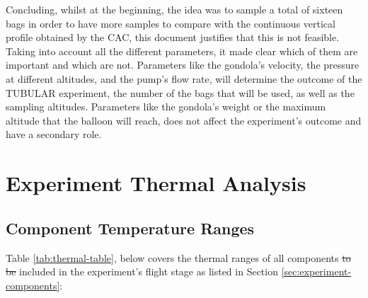 \documentclass[a4paper,12pt,oneside]{article}
\providecommand{\DIFdeltex}[1]{{\protect\color{red}\sout{#1}}}                      %
\providecommand{\DIFdelbegin}{} %
\providecommand{\DIFdelend}{} %
\providecommand{\DIFdel}[1]{\texorpdfstring{\DIFdeltex{#1}}{}} %
\newcommand{\DIFscaledelfig}{0.5}
\newlength{\DIFdelgraphicswidth} %
\newlength{\DIFdelgraphicsheight} %
\newcommand{\DIFdelincludegraphics}[2][]{%
\sbox{\DIFdelgraphicsbox}{\DIFOincludegraphics[#1]{#2}}%
\settoboxwidth{\DIFdelgraphicswidth}{\DIFdelgraphicsbox} %
\settoboxtotalheight{\DIFdelgraphicsheight}{\DIFdelgraphicsbox} %
\scalebox{\DIFscaledelfig}{%
\parbox[b]{\DIFdelgraphicswidth}{\usebox{\DIFdelgraphicsbox}\\[-\baselineskip] \rule{\DIFdelgraphicswidth}{0em}}\llap{\resizebox{\DIFdelgraphicswidth}{\DIFdelgraphicsheight}{%
\setlength{\unitlength}{\DIFdelgraphicswidth}%
\begin{picture}(1,1)%
\thicklines\linethickness{2pt} %
{\color[rgb]{1,0,0}\put(0,0){\framebox(1,1){}}}%
{\color[rgb]{1,0,0}\put(0,0){\line( 1,1){1}}}%
{\color[rgb]{1,0,0}\put(0,1){\line(1,-1){1}}}%
\end{picture}%
}\hspace*{3pt}}} %
} %
\DeclareRobustCommand{\DIFdelbegin}{\DIFOdelbegin \let\includegraphics\DIFdelincludegraphics} %
\DeclareRobustCommand{\DIFdelend}{\DIFOaddend \let\includegraphics\DIFOincludegraphics} %
\begin{document}
\begin{appendices}
Concluding, whilst at the beginning, the idea was to sample a total of sixteen bags in order to have more samples to compare with the continuous vertical profile obtained by the CAC, this document justifies that this is not feasible. Taking into account all the different parameters, it made clear which of them are important and which are not. Parameters like the gondola's velocity, the pressure at different altitudes, and the pump's flow rate, will determine the outcome of the TUBULAR experiment, the number of the bags that will be used, as well as the sampling altitudes. Parameters like the gondola's weight or the maximum altitude that the balloon will reach, does not affect the experiment's outcome and have a secondary role.









\newpage
\newpage
\section{Experiment Thermal Analysis} \label{sec:appI}
\subsection{Component Temperature Ranges}

Table {\ref{tab:thermal-table}}, below covers the thermal ranges of all components \DIFdelbegin \DIFdel{to be }\DIFdelend included in the experiment's flight stage as listed in Section \ref{sec:experiment-components}:






\end{appendices}
\end{document}
